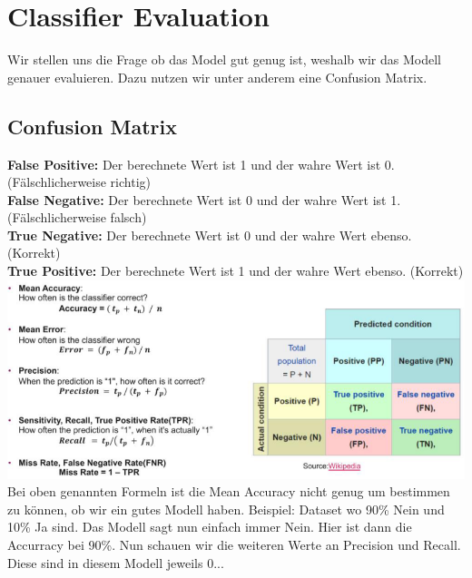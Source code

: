 \section{Classifier Evaluation}
Wir stellen uns die Frage ob das Model gut genug ist, weshalb wir das Modell genauer evaluieren. Dazu nutzen wir unter anderem eine Confusion Matrix.
\subsection{Confusion Matrix}
\textbf{False Positive:} Der berechnete Wert ist 1 und der wahre Wert ist 0. (Fälschlicherweise richtig)\\
\textbf{False Negative:} Der berechnete Wert ist 0 und der wahre Wert ist 1. (Fälschlicherweise falsch)\\
\textbf{True Negative:} Der berechnete Wert ist 0 und der wahre Wert ebenso. (Korrekt)\\
\textbf{True Positive:} Der berechnete Wert ist 1 und der wahre Wert ebenso. (Korrekt)\\
\includegraphics[height=\linewidth, angle=90]{img/confusion_matrix.png}
Bei oben genannten Formeln ist die Mean Accuracy nicht genug um bestimmen zu können, ob wir ein gutes Modell haben. Beispiel: Dataset wo 90\% Nein und 10\% Ja sind. Das Modell sagt nun einfach immer Nein. Hier ist dann die Accurracy bei 90\%. Nun schauen wir die weiteren Werte an Precision und Recall. Diese sind in diesem Modell jeweils 0...
